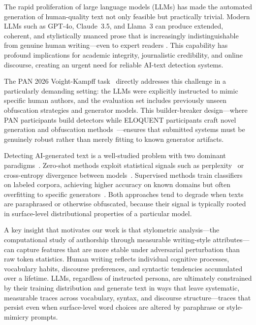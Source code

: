 The rapid proliferation of large language models (LLMs) has made the automated generation of
human-quality text not only feasible but practically trivial. Modern LLMs such as GPT-4o,
Claude~3.5, and Llama~3 can produce extended, coherent, and stylistically nuanced prose that
is increasingly indistinguishable from genuine human writing—even to expert readers
\cite{jakesch:2023}. This capability has profound implications for academic integrity,
journalistic credibility, and online discourse, creating an urgent need for reliable AI-text
detection systems.

The PAN 2026 Voight-Kampff task~\cite{bevendorff:2025,bevendorff:2026overview} directly addresses
this challenge in a particularly demanding setting: the LLMs were explicitly instructed to mimic
specific human authors, and the evaluation set includes previously unseen obfuscation strategies
and generator models. This builder-breaker design—where PAN participants build detectors while
ELOQUENT participants craft novel generation and obfuscation methods~\cite{bevendorff:2024d}—ensures
that submitted systems must be genuinely robust rather than merely fitting to known generator artifacts.

Detecting AI-generated text is a well-studied problem with two dominant paradigms~\cite{bevendorff:2025b}.
Zero-shot methods exploit statistical signals such as perplexity~\cite{mitchell:2023,bao:2023} or
cross-entropy divergence between models~\cite{hans:2024,su:2023}. Supervised methods train classifiers
on labeled corpora, achieving higher accuracy on known domains but often overfitting to specific
generators~\cite{bevendorff:2024d}. Both approaches tend to degrade when texts are paraphrased or
otherwise obfuscated, because their signal is typically rooted in surface-level distributional
properties of a particular model.

A key insight that motivates our work is that stylometric analysis—the computational study of
authorship through measurable writing-style attributes—can capture features that are more
stable under adversarial perturbation than raw token statistics. Human writing reflects
individual cognitive processes, vocabulary habits, discourse preferences, and syntactic
tendencies accumulated over a lifetime. LLMs, regardless of instructed persona, are ultimately
constrained by their training distribution and generate text in ways that leave systematic,
measurable traces across vocabulary, syntax, and discourse structure—traces that persist
even when surface-level word choices are altered by paraphrase or style-mimicry prompts.

